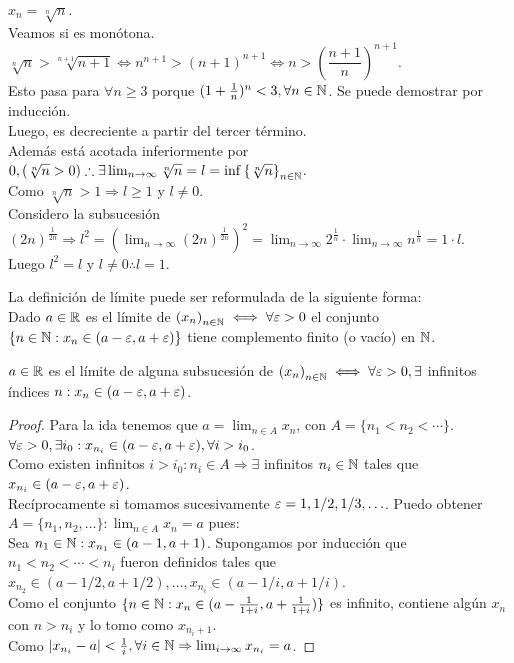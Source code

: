 \begin{eg}
  \(x_n = \sqrt[n]{n} \). \\
  Veamos si es monótona. \(\sqrt[n]{n} > \sqrt[n+1]{n+1} \iff n^{n+1} > (n+1)^{n+1} \iff n > (\dfrac{n+1}{n})^{n+1} \). \\
  Esto pasa para \(\forall n \geq 3\) porque \((1+\frac{1}{n})^n < 3, \forall n \in \mathbb{N} \). Se puede demostrar por inducción. \\
  Luego, es decreciente a partir del tercer término. \\
  Además está acotada inferiormente por \(0, (\sqrt[n]{n} > 0) \therefore \exists \lim_{n \to \infty} \sqrt[n]{n} = l = \inf {\{ \sqrt[n]{n} \}}_{n \in \mathbb{N}} \). \\
  Como \(\sqrt[n]{n} > 1 \Rightarrow l \geq 1\) y \(l \neq 0\). \\
  Considero la subsucesión \((2n)^{\frac{1}{2n}} \Rightarrow l^2 = (\lim_{n \to \infty} {(2n)}^{\frac{1}{2n}})^2 = \lim_{n \to \infty} 2^{\frac{1}{n}} \cdot \lim_{n \to \infty} n^{\frac{1}{n}} = 1 \cdot l\). \\
  Luego \(l^2 = l\) y \(l \neq 0 \therefore l = 1\).
\end{eg}

\begin{note}
  La definición de límite puede ser reformulada de la siguiente forma: \\
  Dado \(a \in \mathbb{R} \) es el límite de \({(x_n)}_{n \in \mathbb{N}} \iff \forall \varepsilon > 0\) el conjunto \( \{ n \in \mathbb{N} : x_n \in (a - \varepsilon, a + \varepsilon) \} \) tiene complemento finito (o vacío) en \(\mathbb{N} \).
\end{note}

\begin{theorem}
  \(a \in \mathbb{R} \) es el límite de alguna subsucesión de \({(x_n)}_{n \in \mathbb{N}} \iff \forall \varepsilon > 0, \exists \) infinitos índices \(n : x_n \in (a-\varepsilon, a+\varepsilon)\).
  \begin{proof}
    Para la ida tenemos que \(a = \lim_{n \in A} x_n\), con \(A = \{ n_1 < n_2 < \cdots \} \). \\
    \(\forall \varepsilon > 0, \exists i_0 : x_{n_i} \in (a - \varepsilon, a + \varepsilon), \forall i > i_0\). \\
    Como existen infinitos \(i > i_0 : n_i \in A \Rightarrow \exists \) infinitos \(n_i \in \mathbb{N} \) tales que \(x_{n_i} \in (a - \varepsilon, a + \varepsilon)\). \\
    Recíprocamente si tomamos sucesivamente \(\varepsilon = 1, 1/2, 1/3, \ldots \). Puedo obtener \(A = \{ n_1, n_2, \ldots \} : \lim_{n \in A} x_n = a\) pues: \\
    Sea \(n_1 \in \mathbb{N} : x_{n_1} \in (a-1, a+1)\). Supongamos por inducción que \(n_1 < n_2 < \cdots < n_i\) fueron definidos tales que \(x_{n_2} \in (a - 1/2, a + 1/2), \ldots, x_{n_i} \in (a - 1/i, a + 1/i)\). \\
    Como el conjunto \( \{ n \in \mathbb{N} : x_n \in (a - \frac{1}{1+i}, a + \frac{1}{1+i}) \} \) es infinito, contiene algún \(x_n\) con \(n > n_i\) y lo tomo como \(x_{n_i + 1} \). \\
    Como \(| x_{n_i} - a | < \frac{1}{i}, \forall i \in \mathbb{N} \Rightarrow \lim_{i \to \infty} x_{n_i} = a\).
  \end{proof}
\end{theorem}

